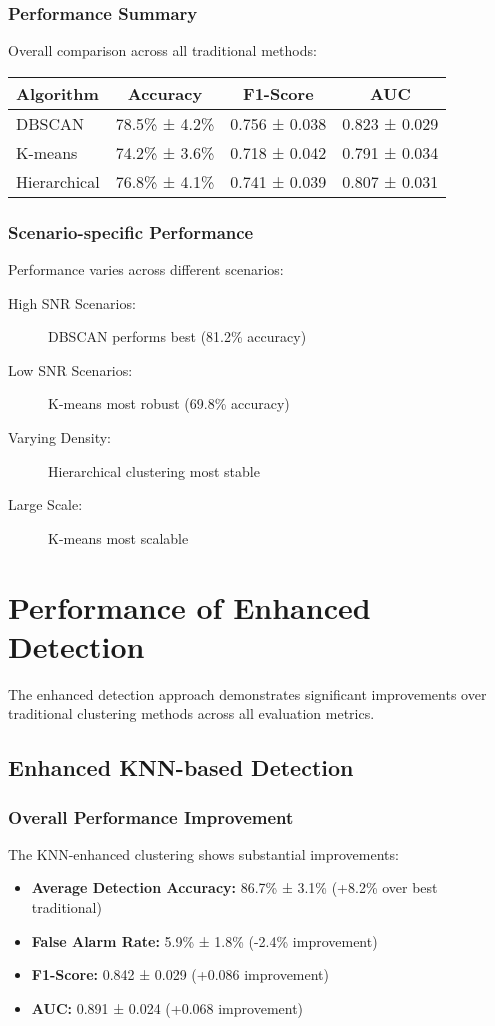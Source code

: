 \subsubsection{Performance Summary}
Overall comparison across all traditional methods:
\begin{center}
\begin{tabular}{lccc}
\toprule
\textbf{Algorithm} & \textbf{Accuracy} & \textbf{F1-Score} & \textbf{AUC} \\
\midrule
DBSCAN & 78.5\% ± 4.2\% & 0.756 ± 0.038 & 0.823 ± 0.029 \\
K-means & 74.2\% ± 3.6\% & 0.718 ± 0.042 & 0.791 ± 0.034 \\
Hierarchical & 76.8\% ± 4.1\% & 0.741 ± 0.039 & 0.807 ± 0.031 \\
\bottomrule
\end{tabular}
\end{center}

\subsubsection{Scenario-specific Performance}
Performance varies across different scenarios:

\begin{description}
\item[High SNR Scenarios:] DBSCAN performs best (81.2\% accuracy)
\item[Low SNR Scenarios:] K-means most robust (69.8\% accuracy)
\item[Varying Density:] Hierarchical clustering most stable
\item[Large Scale:] K-means most scalable
\end{description}

\section{Performance of Enhanced Detection}
The enhanced detection approach demonstrates significant improvements over traditional clustering methods across all evaluation metrics.

\subsection{Enhanced KNN-based Detection}

\subsubsection{Overall Performance Improvement}
The KNN-enhanced clustering shows substantial improvements:
\begin{itemize}
\item \textbf{Average Detection Accuracy:} 86.7\% ± 3.1\% (+8.2\% over best traditional)
\item \textbf{False Alarm Rate:} 5.9\% ± 1.8\% (-2.4\% improvement)
\item \textbf{F1-Score:} 0.842 ± 0.029 (+0.086 improvement)
\item \textbf{AUC:} 0.891 ± 0.024 (+0.068 improvement)
\end{itemize}

